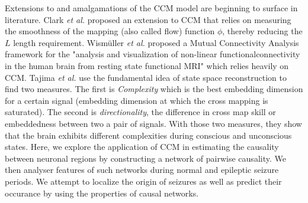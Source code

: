 Extensions to and amalgamations of the CCM model are beginning to surface in literature. Clark \textit{et al.} proposed an extension to CCM that relies on measuring the smoothness of the mapping (also called flow) function $\phi$, thereby reducing the $L$ length requirement\cite{Clark2015}.  Wismüller \textit{et al.} proposed a Mutual Connectivity Analysis framework for the "analysis and visualization of non-linear functionalconnectivity in the human brain from resting state functional MRI" \cite{wismuller2014} which relies heavily on CCM. Tajima \textit{\textit{et al.}} use the fundamental idea of state space reconstruction to find two measures. The first is \textit{Complexity} which is the best embedding dimension for a certain signal (embedding dimension at which the cross mapping is saturated). The second is \textit{directionality}, the difference in cross map skill or embeddedness between two a pair of signals. With those two measures, they show that the brain exhibits different complexities during conscious and unconscious states. Here, we explore the application of CCM in estimating the causality between neuronal regions by constructing a network of pairwise causality. We then analyser features of such networks during normal and epileptic seizure periods. We attempt to localize the origin of seizures as well as predict their occurance by using the properties of causal networks.


